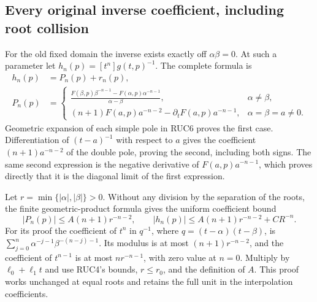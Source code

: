 \documentclass[11pt]{article}
\begin{document}
\subsection{Every original inverse coefficient, including root collision}

For the old fixed domain the inverse exists exactly off
$\alpha\beta=0$.  At such a parameter let
$h_n(p)=[t^n]g(t,p)^{-1}$.  The complete formula is
\[
 \begin{aligned}
 h_n(p)&=P_n(p)+r_n(p),\\
 P_n(p)&=\begin{cases}
 \displaystyle\frac{F(\beta,p)\beta^{-n-1}
                   -F(\alpha,p)\alpha^{-n-1}}{\alpha-\beta},
                         &\alpha\ne\beta,\\[6pt]
 (n+1)F(a,p)a^{-n-2}-\partial_tF(a,p)a^{-n-1},
                         &\alpha=\beta=a\ne0.
 \end{cases}
 \end{aligned}\tag{RUC8}
\]
Geometric expansion of each simple pole in RUC6 proves the first
case.  Differentiation of $(t-a)^{-1}$ with respect to $a$ gives
the coefficient $(n+1)a^{-n-2}$ of the double pole, proving the
second, including both signs.  The same second expression is the
negative derivative of $F(a,p)a^{-n-1}$, which proves directly
that it is the diagonal limit of the first expression.

Let $r=\min\{|\alpha|,|\beta|\}>0$.  Without any division by
the separation of the roots, the finite geometric-product formula
gives the uniform coefficient bound
\[
 |P_n(p)|\le A(n+1)r^{-n-2},\qquad
 |h_n(p)|\le A(n+1)r^{-n-2}+CR^{-n}.
 \tag{RUC9}
\]
For its proof the coefficient of $t^n$ in $q^{-1}$, where
$q=(t-\alpha)(t-\beta)$, is
$\sum_{j=0}^n\alpha^{-j-1}\beta^{-(n-j)-1}$.
Its modulus is at most $(n+1)r^{-n-2}$, and the coefficient of
$t^{n-1}$ is at most $nr^{-n-1}$, with zero value at $n=0$.
Multiply by $\ell_0+\ell_1t$ and use RUC4's bounds, $r\le r_0$,
and the definition of $A$.  This proof works unchanged at equal
roots and retains the full unit in the interpolation coefficients.
\end{document}
